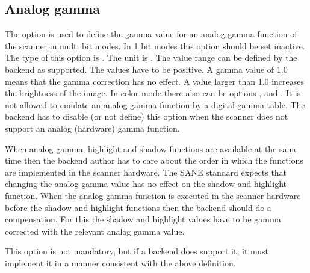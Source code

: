 \documentclass[11pt,DVIps]{report}
\begin{document}
\subsection{Analog gamma}
\begin{changebar}
The option  is used to define the gamma value 
for an analog gamma function of the scanner in multi bit modes.
In 1 bit modes this option should be set inactive.
The type of this option is .
The unit is . The value range
can be defined by the backend as supported. The values
have to be positive. A gamma value of 1.0 means that
the gamma correction has no effect. A value larger than
1.0 increases the brightness of the image.
In color mode there also can be options ,
 and .
It is not allowed to emulate an analog gamma function by
a digital gamma table. The backend has to disable (or not
define) this option when the scanner does not support an
analog (hardware) gamma function.

When analog gamma, highlight and shadow functions are available
at the same time then the backend author has to care about the order
in which the functions are implemented in the scanner hardware.
The SANE standard expects that changing the analog gamma value
has no effect on the shadow and highlight function. When the
analog gamma function is executed in the scanner hardware
before the shadow and highlight functions then the backend
should do a compensation. For this the shadow and highlight
values have to be gamma corrected with the relevant analog gamma value.

This option is not mandatory, but if a backend does support it, it
must implement it in a manner consistent with the above definition.\\
\end{changebar}
\end{document}
